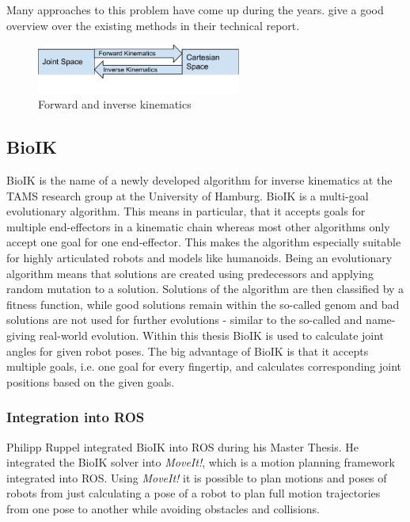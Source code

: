 Many approaches to this problem have come up during the years. \citeauthor{andreasaristidou2009inverse} give a good overview over the existing methods in their technical report\cite{DextquotesingleSouza}.

\begin{figure}
	\caption{Forward and inverse kinematics\label{fig:basics:kinematics}}
	\begin{center}
		\includegraphics[width=0.6\textwidth]{assets/chpt_basics/Kinematics.pdf}
	\end{center}
\end{figure}

\subsection{BioIK}

BioIK is the name of a newly developed algorithm for inverse kinematics at the TAMS research group at the University of Hamburg\cite{Starke2017}. BioIK is a multi-goal evolutionary algorithm. This means in particular, that it accepts goals for multiple end-effectors in a kinematic chain whereas most other algorithms only accept one goal for one end-effector. This makes the algorithm especially suitable for highly articulated robots and models like humanoids\cite{Starkea2017}. Being an evolutionary algorithm means that solutions are created using predecessors and applying random mutation to a solution. Solutions of the algorithm are then classified by a fitness function, while good solutions remain within the so-called genom and bad solutions are not used for further evolutions\cite{Ruppel17} - similar to the so-called and name-giving real-world evolution. Within this thesis BioIK is used to calculate joint angles for given robot poses. The big advantage of BioIK is that it accepts multiple goals, i.e. one goal for every fingertip, and calculates corresponding joint positions based on the given goals.

\subsubsection{Integration into ROS}
Philipp Ruppel integrated BioIK into ROS during his Master Thesis\cite{Ruppel17}. He integrated the BioIK solver into \textit{MoveIt!}, which is a motion planning framework integrated into ROS\cite{Coleman15}. Using \textit{MoveIt!} it is possible to plan motions and poses of robots from just calculating a pose of a robot to plan full motion trajectories from one pose to another while avoiding obstacles and collisions.

